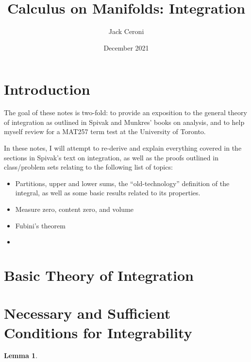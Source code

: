 \documentclass[10pt, oneside]{amsart}
\title{Calculus on Manifolds: Integration}
\author{Jack Ceroni}
\date{December 2021}
\newtheorem{lem}{Lemma}
\begin{document}
    \maketitle

    \tableofcontents

    \vspace{.25in}

    \newpage

    \hrulefill

    \section{Introduction}

    The goal of these notes is two-fold: to provide an exposition to the general theory of integration as outlined in Spivak and Munkres' books on analysis, and
    to help myself review for a MAT257 term test at the University of Toronto.
    \newline

    In these notes, I will attempt to re-derive and explain everything covered in the sections in Spivak's text on integration, as well as the proofs outlined in class/problem sets relating to
    the following list of topics:

    \begin{itemize}
    \item Partitions, upper and lower sums, the ``old-technology'' definition of the integral, as well as some basic results related to its properties.
    \item Measure zero, content zero, and volume
    \item Fubini's theorem
      \item 
      \end{itemize}

    \hrulefill

    \section{Basic Theory of Integration}

    \hrulefill

    \section{Necessary and Sufficient Conditions for Integrability}

    \hrulefill

    \begin{lem}

      \end{lem}
\end{document}
